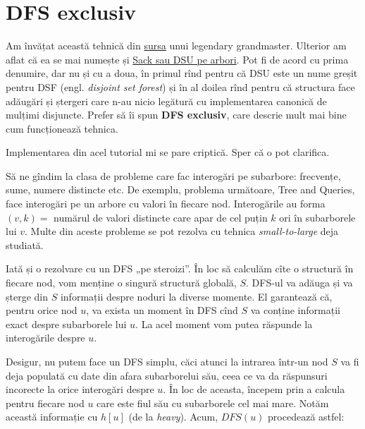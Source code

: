 \documentclass[../main.tex]{subfiles}
\begin{document}
\section{DFS exclusiv}

Am învățat această tehnică din \href{https://codeforces.com/contest/375/submission/5508178}{sursa} unui legendary grandmaster.  Ulterior am aflat că ea se mai numește și \href{https://codeforces.com/blog/entry/44351}{Sack sau DSU pe arbori}. Pot fi de acord cu prima denumire, dar nu și cu a doua, în primul rînd pentru că DSU este un nume greșit pentru DSF (engl. \textit{disjoint set forest}) și în al doilea rînd pentru că structura face adăugări și ștergeri care n-au nicio legătură cu implementarea canonică de mulțimi disjuncte. Prefer să îi spun \textbf{DFS exclusiv}, care descrie mult mai bine cum funcționează tehnica.

Implementarea din acel tutorial mi se pare criptică. Sper că o pot clarifica.

Să ne gîndim la clasa de probleme care fac interogări pe subarbore: frecvențe, sume, numere distincte etc. De exemplu, problema următoare, Tree and Queries, face interogări pe un arbore cu valori în fiecare nod. Interogările au forma $(v,k) = $ numărul de valori distincte care apar de cel puțin $k$ ori în subarborele lui $v$. Multe din aceste probleme se pot rezolva cu tehnica \textit{small-to-large} deja studiată.

Iată și o rezolvare cu un DFS „pe steroizi”. În loc să calculăm cîte o structură în fiecare nod, vom menține o singură structură globală, $S$. DFS-ul va adăuga și va șterge din $S$ informații despre noduri la diverse momente. El garantează că, pentru orice nod $u$, va exista un moment în DFS cînd $S$ va conține informații exact despre subarborele lui $u$. La acel moment vom putea răspunde la interogările despre $u$.

Desigur, nu putem face un DFS simplu, căci atunci la intrarea într-un nod $S$ va fi deja populată cu date din afara subarborelui său, ceea ce va da răspunsuri incorecte la orice interogări despre $u$. În loc de aceasta, începem prin a calcula pentru fiecare nod $u$ care este fiul său cu subarborele cel mai mare. Notăm această informație cu $h[u]$ (de la \textit{heavy}). Acum, $DFS(u)$ procedează astfel:
\end{document}
